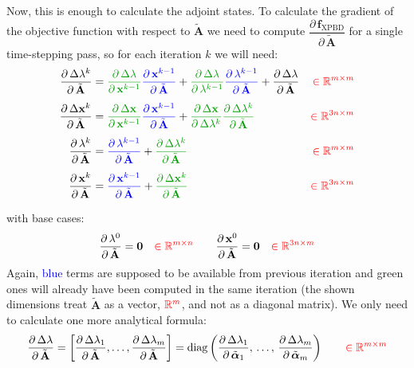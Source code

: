 \documentclass{article}
\newcommand{\pd}[2]{\dfrac{\partial\, #1}{\partial\, #2}}
\newcommand{\red}[1]{\textcolor{red}{#1}}
\newcommand{\blue}[1]{\textcolor{blue}{#1}}
\newcommand{\green}[1]{\textcolor{MyGreen}{#1}}
\begin{document}
Now, this is enough to calculate the adjoint states. To calculate the gradient of the objective function with respect to $\tilde{\mathbf{A}}$ we need to compute $\pd{\mathbf{f}_{\text{XPBD}}}{\tilde{\mathbf{A}}}$ for a single time-stepping pass, so for each iteration $k$ we will need:
\begin{equation}
\begin{aligned}
\pd{\Delta\lambda^k}{\tilde{\mathbf{A}}} &= 
     \green{\pd{\Delta\lambda}{\mathbf{x}^{k-1}}}
     \blue{\pd{\mathbf{x}^{k-1}}{\tilde{\mathbf{A}}}} + 
     \green{\pd{\Delta\lambda}{\lambda^{k-1}}}
     \blue{\pd{\lambda^{k-1}}{\tilde{\mathbf{A}}}} +
     \pd{\Delta\lambda}{\tilde{\mathbf{A}}}
     &\red{\in \mathbb{R}^{m \times m}}   
\\[1ex]
\pd{\Delta\mathbf{x}^k}{\tilde{\mathbf{A}}} &= 
    \green{\pd{\Delta\mathbf{x}}{\mathbf{x}^{k-1}}}
    \blue{\pd{\mathbf{x}^{k-1}}{\tilde{\mathbf{A}}}} + 
    \green{\pd{\Delta\mathbf{x}}{\Delta \lambda^{k}}}
    \green{\pd{\Delta\lambda^k}{\tilde{\mathbf{A}}}}
     &\red{\in \mathbb{R}^{3n \times m}}
\\[1ex]
\pd{\lambda^k}{\tilde{\mathbf{A}}} &= 
     \blue{\pd{\lambda^{k-1}}{\tilde{\mathbf{A}}}} +  
     \green{\pd{\Delta\lambda^k}{\tilde{\mathbf{A}}}}
     &\red{\in \mathbb{R}^{m \times m}}
\\[1ex]
\pd{\mathbf{x}^k}{\tilde{\mathbf{A}}} &= 
    \blue{\pd{\mathbf{x}^{k-1}}{\tilde{\mathbf{A}}}} +  
    \green{\pd{\Delta\mathbf{x}^k}{\tilde{\mathbf{A}}}}
    &\red{\in \mathbb{R}^{3n \times m}}
\\[1ex]
\end{aligned}    
\end{equation}
with base cases:
\begin{equation}
\begin{aligned}   
\pd{\lambda^0}{\tilde{\mathbf{A}}} &= 
    \mathbf{0}
    &\red{\in \mathbb{R}^{m \times n}}
\qquad
\pd{\mathbf{x}^0}{\tilde{\mathbf{A}}} &= 
    \mathbf{0}
    &\red{\in \mathbb{R}^{3n \times m}}
\end{aligned}    
\end{equation}
Again, \blue{blue} terms are supposed to be available from previous iteration and \green{green} ones will already have been computed in the same iteration (the shown dimensions treat $\tilde{\mathbf{A}}$ as a vector, $\red{\mathbb{R}^{m}}$, and not as a diagonal matrix). We only need to calculate one more analytical formula:
\begin{equation*}
\pd{\Delta\lambda}{\tilde{\mathbf{A}}} = 
    \left[
        \pd{\Delta\lambda_1}{\tilde{\mathbf{A}}},
        \dots,
        \pd{\Delta\lambda_m}{\tilde{\mathbf{A}}}
    \right] = 
\operatorname{diag}\left(
    \pd{\Delta\lambda_1}{\tilde{\boldsymbol{\alpha}}_1},\,
    \dots,\,
    \pd{\Delta\lambda_m}{\tilde{\boldsymbol{\alpha}}_m}
\right)
\qquad \red{\in \mathbb{R}^{m \times m}}
\end{equation*}
\end{document}
